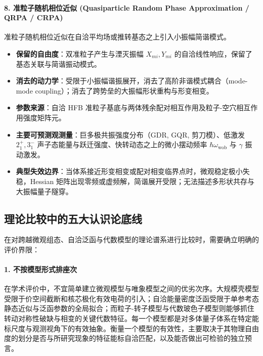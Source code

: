 \paragraph{8. 准粒子随机相位近似 (Quasiparticle Random Phase Approximation / QRPA / CRPA)}
准粒子随机相位近似在自洽平均场或推转基态之上引入小振幅简谐模式。\cite{book-suhonen-from-nucleons-to-nucleus,matsuzaki-2004-nuclear-inertia-and-wobbling,kvasil-2006-dy156-yb162-crpa-wobbling}
\begin{itemize}
\item \textbf{保留的自由度}：双准粒子产生与湮灭振幅 $X_{mi}, Y_{mi}$ 的自洽线性响应，保留了基态关联与简谐振动模式。
\item \textbf{消去的动力学}：受限于小振幅谐振展开，消去了高阶非谐模式耦合（mode-mode coupling）；消去了跨势垒的大振幅形状重构与形变相变。
\item \textbf{参数来源}：自洽 HFB 准粒子基底与两体残余配对相互作用及粒子-空穴相互作用强度矩阵元。
\item \textbf{主要可预测观测量}：巨多极共振强度分布（GDR, GQR, 剪刀模）、低激发 $2_1^+, 3_1^-$ 声子态能量与跃迁强度、快转动态之上的微小摆动频率 $\hbar\omega_{\mathrm{wob}}$ 与 $\gamma$ 振动激发。
\item \textbf{典型失效边界}：当体系接近形变相变或配对相变临界点时，微观稳定极小失稳，Hessian 矩阵出现零频或虚频解，简谐展开受限；无法描述多形状共存与大振幅量子隧穿。
\end{itemize}

\subsection{理论比较中的五大认识论底线}\label{sec:2-8-3}

在对跨越微观组态、自洽泛函与代数模型的理论谱系进行比较时，需要确立明确的评价界限：

\paragraph{1. 不按模型形式排座次}
在学术评价中，不宜简单建立微观模型与唯象模型之间的优劣次序。大规模壳模型受限于价空间截断和核芯极化有效电荷的引入；自洽能量密度泛函受限于单参考态静态近似与泛函参数的全局拟合；而粒子-转子模型与代数玻色子模型则能够抓住转动对称性破缺与相变的关键代数特征。每一个模型都是对多体量子体系在特定能标尺度与观测视角下的有效抽象。衡量一个模型的有效性，主要取决于其物理自由度的划分是否与所研究现象的特征能标自洽匹配，以及能否做出可检验的独立预言。

